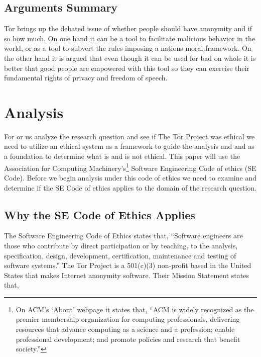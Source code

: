 \documentclass[11pt]{article}
\begin{document}
\begin{multicols}{2}
\subsection{Arguments Summary}

Tor brings up the debated issue of whether people should have anonymity and if so
how much. On one hand it can be a tool to facilitate malicious behavior in the
world, or as a tool to subvert the rules imposing a nations moral framework. On
the other hand it is argued that even though it can be used for bad on whole it
is  better that good people are empowered with this tool so they can exercise
their fundamental rights of privacy and freedom of speech.

\section{Analysis}

For or us analyze the research question and see if The Tor
Project was ethical we need to utilize an ethical system as a framework
to guide the analysis and and as a foundation to determine what is and is
not ethical. This paper will use the Association for Computing
Machinery's\footnote{On ACM's `About' webpage it states that, ``ACM is widely
  recognized as the premier membership organization for computing professionals,
  delivering resources that advance computing as a science and a profession;
  enable professional development; and promote policies and research that
  benefit society.''\cite{ACM:About}} Software Engineering Code of ethics (SE
  Code).  Before we begin analysis under this code of ethics we need to examine
  and determine if the SE Code of ethics applies to the domain of the research
  question.

\subsection{Why the SE Code of Ethics Applies} 

The Software Engineering Code of Ethics states that, ``Software engineers are
those who contribute by direct participation or by teaching, to the analysis,
specification, design, development, certification, maintenance and testing of
software systems.'' \cite{SE:CodeOfEthics} The Tor Project is a 501(c)(3)
non-profit based in the United States that makes Internet anonymity
software.\cite{Tor:FAQ, Tor:CorePeople} Their Mission Statement states that,


\end{multicols}
\end{document}
